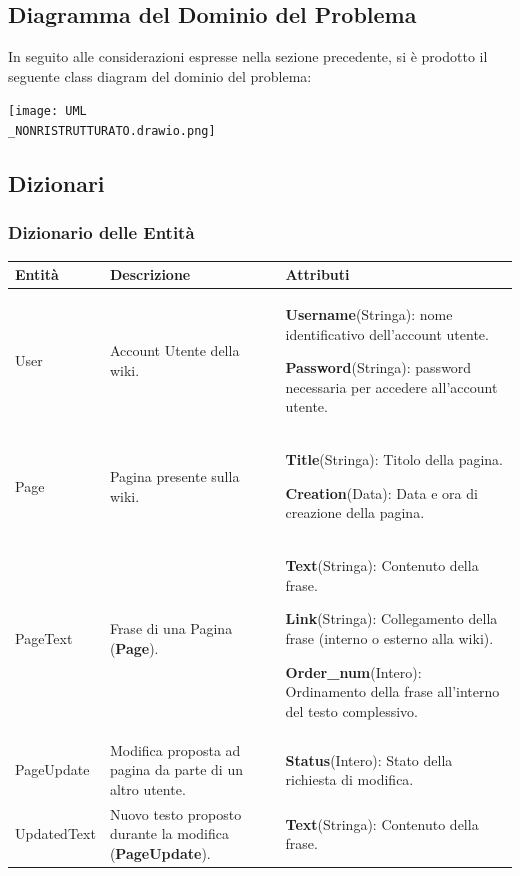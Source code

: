 \documentclass{article}
\begin{document}
{		\newpage
		
		
		\subsection{Diagramma del Dominio del Problema}
		In seguito alle considerazioni espresse nella sezione precedente, si è prodotto il seguente class diagram del dominio del problema:
		\begin{center}
			\texttt{[image: UML\\\_NONRISTRUTTURATO.drawio.png]}
		\end{center}
		
		\subsection{Dizionari}
		{\subsubsection{Dizionario delle Entità}}
		
		\begin{table}[H]
			\centering
			\small %
			\setlength{\tabcolsep}{6pt} %
			\renewcommand{\arraystretch}{1.2} %
			
			\begin{tabularx}{\textwidth}{|l|X|X|}
				\hline
				\textbf{Entità} & \textbf{Descrizione} & \textbf{Attributi} \\
				\hline
				User & Account Utente della wiki. & 
				\textbf{Username}(Stringa): nome identificativo dell'account utente.
				
				\textbf{Password}(Stringa): password necessaria
				per accedere all’account utente. \\
				\hline
				Page & Pagina presente sulla wiki. & 
				\textbf{Title}(Stringa): Titolo della pagina.
				
				\textbf{Creation}(Data): Data e ora di creazione della pagina.
				\\
				\hline
				PageText & Frase di una Pagina (\textbf{Page}). &
				\textbf{Text}(Stringa): Contenuto della frase.
				
				\textbf{Link}(Stringa): Collegamento della frase (interno o esterno alla wiki).
				
				\textbf{Order\_num}(Intero): Ordinamento della frase all'interno del testo complessivo.
				\\
				\hline
				PageUpdate & Modifica proposta ad pagina da parte di un altro utente. & 
				\textbf{Status}(Intero): Stato della richiesta di modifica.
				\\
				\hline
				UpdatedText & Nuovo testo proposto durante la modifica (\textbf{PageUpdate}). & 
				\textbf{Text}(Stringa): Contenuto della frase.
				

\end{tabularx}
\end{table}}
\end{document}
